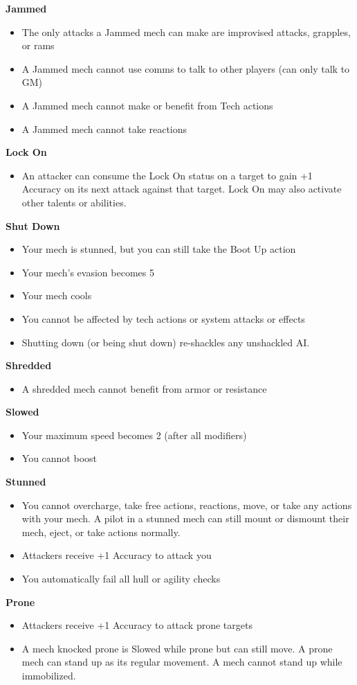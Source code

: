 \textbf{Jammed}
\begin{itemize}
	\item The only attacks a Jammed mech can make are improvised attacks, grapples, or rams
	\item A Jammed mech cannot use comms to talk to other players (can only talk to GM) 
	\item A Jammed mech cannot make or benefit from Tech actions
	\item A Jammed mech cannot take reactions
\end{itemize}

\textbf{Lock On}
\begin{itemize}
	\item An attacker can consume the Lock On status on a target to gain +1 Accuracy on its next attack against that target. Lock On may also activate other talents or abilities.
\end{itemize}

\textbf{Shut Down}
\begin{itemize}
	\item Your mech is stunned, but you can still take the Boot Up action
	\item Your mech’s evasion becomes 5
	\item Your mech cools
	\item You cannot be affected by tech actions or system attacks or effects
	\item Shutting down (or being shut down) re-shackles any unshackled AI.
\end{itemize}

\textbf{Shredded}
\begin{itemize}
	\item A shredded mech cannot benefit from armor or resistance
\end{itemize}

\textbf{Slowed}
\begin{itemize}
	\item Your maximum speed becomes 2 (after all modifiers)
	\item You cannot boost
\end{itemize}

\textbf{Stunned}
\begin{itemize}
	\item You cannot overcharge, take free actions, reactions, move, or take any actions with your mech. A pilot in a stunned mech can still mount or dismount their mech, eject, or take actions normally.
	\item Attackers receive +1 Accuracy to attack you
	\item You automatically fail all hull or agility checks
\end{itemize}

\textbf{Prone}
\begin{itemize}
	\item Attackers receive +1 Accuracy to attack prone targets
	\item A mech knocked prone is Slowed while prone but can still move. A prone mech can stand up as its regular movement. A mech cannot stand up while immobilized.
\end{itemize}

